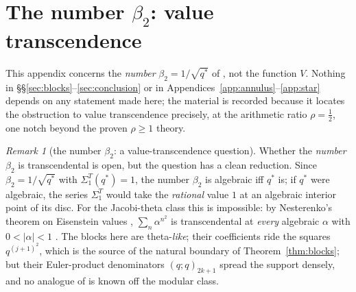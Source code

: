 \documentclass[11pt]{article}
\theoremstyle{plain}
\theoremstyle{definition}
\theoremstyle{remark}
\newtheorem{remark}[theorem]{Remark}
\begin{document}
\section{The number \texorpdfstring{$\beta_2$}{beta2}: value transcendence}\label{app:beta2}

This appendix concerns the \emph{number} $\beta_2=1/\sqrt{q^\ast}$ of {\cite[Corollary \textup{cor:beta}]{Bonfioli2026bA}},
not the function $V$. Nothing in \S\S\ref{sec:blocks}--\ref{sec:conclusion} or in
Appendices~\ref{app:annulus}--\ref{app:star} depends on any statement made here; the material is
recorded because it locates the obstruction to value transcendence precisely, at the arithmetic
ratio $\rho=\tfrac12$, one notch beyond the proven $\rho\ge1$ theory.

\begin{remark}[the number $\beta_2$: a value-transcendence question]\label{rem:betanumber}
Whether the \emph{number} $\beta_2$ is transcendental is open, but the question has a clean
reduction. Since $\beta_2=1/\sqrt{q^\ast}$ with $\Sigma_1^T(q^\ast)=1$, the number $\beta_2$ is
algebraic iff $q^\ast$ is; if $q^\ast$ were algebraic, the series $\Sigma_1^T$ would take the
\emph{rational} value $1$ at an algebraic interior point of its disc. For the Jacobi-theta class
this is impossible: by Nesterenko's theorem on Eisenstein values \cite{Nesterenko1996},
$\sum_n\alpha^{n^2}$ is transcendental at \emph{every} algebraic $\alpha$ with $0<|\alpha|<1$
\cite{DNNS1996}. The blocks here are theta-\emph{like}; their coefficients ride the squares
$q^{(j+1)^2}$, which is the source of the natural boundary of Theorem~\ref{thm:blocks}; but
their Euler-product denominators $(q;q)_{2k+1}$ spread the support densely, and no analogue of
\cite{Nesterenko1996} is known off the modular class.


\end{remark}
\end{document}
